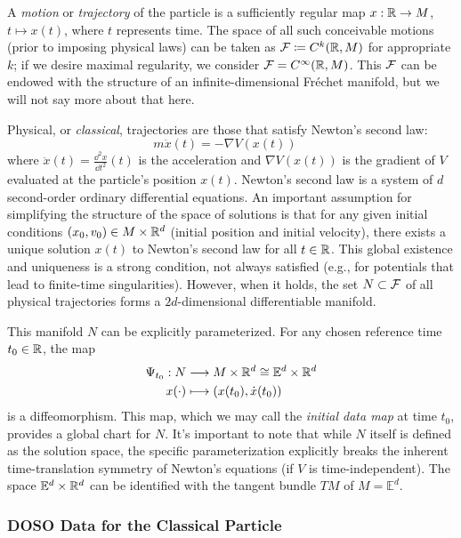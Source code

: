 A \emph{motion} or \emph{trajectory} of the particle is a sufficiently regular map $x: \mathbb{R} \to M$, $t \mapsto x(t)$, where $t$ represents time. The space of all such conceivable motions (prior to imposing physical laws) can be taken as $\mathcal{F} \coloneqq C^k(\mathbb{R}, M)$ for appropriate $k$; if we desire maximal regularity, we consider $\mathcal{F} = C^\infty(\mathbb{R}, M)$. This $\mathcal{F}$ can be endowed with the structure of an infinite-dimensional Fréchet manifold, but we will not say more about that here.

Physical, or \emph{classical}, trajectories are those that satisfy Newton's second law:
\[ m\ddot{x}(t) = -\nabla V(x(t)) \quad  \]
where $\ddot{x}(t) = \frac{\dd^2 x}{\dd t^2}(t)$ is the acceleration and $\nabla V(x(t))$ is the gradient of $V$ evaluated at the particle's position $x(t)$. Newton's second law is a system of $d$ second-order ordinary differential equations. An important assumption for simplifying the structure of the space of solutions is that for any given initial conditions $(x_0, v_0) \in M \times \mathbb{R}^d$ (initial position and initial velocity), there exists a unique solution $x(t)$ to Newton's second law for all $t \in \mathbb{R}$. This global existence and uniqueness is a strong condition, not always satisfied (e.g., for potentials that lead to finite-time singularities). However, when it holds, the set $N \subset \mathcal{F}$ of all physical trajectories forms a $2d$-dimensional differentiable manifold.

This manifold $N$ can be explicitly parameterized. For any chosen reference time $t_0 \in \mathbb{R}$, the map
\begin{align*}
\Psi_{t_0}: N &\longrightarrow M \times \mathbb{R}^d \cong \mathbb{E}^d \times \mathbb{R}^d \\
x(\cdot) &\longmapsto (x(t_0), \dot{x}(t_0))
\end{align*}
is a diffeomorphism. This map, which we may call the \emph{initial data map} at time $t_0$, provides a global chart for $N$. It's important to note that while $N$ itself is  defined as the solution space, the specific parameterization explicitly breaks the inherent time-translation symmetry of Newton's equations (if $V$ is time-independent). The space $\mathbb{E}^d \times \mathbb{R}^d$ can be identified with the tangent bundle $TM$ of $M=\mathbb{E}^d$.

\subsubsection{DOSO Data for the Classical Particle}

